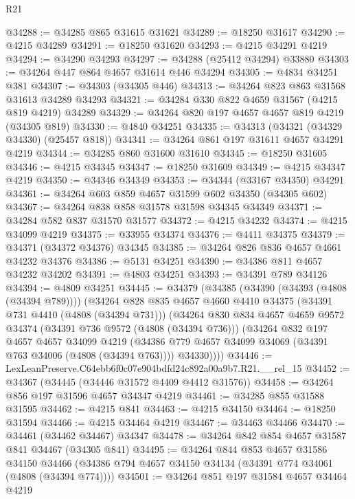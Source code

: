 \begin{lexlean}{R21}
\begin{coremodule}
@34288 := @34285 @865 @31615 @31621
@34289 := @18250 @31617
@34290 := @4215 @34289
@34291 := @18250 @31620
@34293 := @4215 @34291 @4219
@34294 := @34290 @34293
@34297 := @34288 (@25412 @34294) @33880
@34303 := @34264 @447 @864 @4657 @31614 @446 @34294
@34305 := @4834 @34251 @381
@34307 := @34303 (@34305 @446)
@34313 := @34264 @823 @863 @31568 @31613 @34289 @34293
@34321 := @34284 @330 @822 @4659 @31567 (@4215 @819 @4219) @34289
@34329 := @34264 @820 @197 @4657 @4657 @819 @4219 (@34305 @819)
@34330 := @4840 @34251
@34335 := @34313 (@34321 (@34329 @34330) (@25457 @818))
@34341 := @34264 @861 @197 @31611 @4657 @34291 @4219
@34344 := @34285 @860 @31600 @31610
@34345 := @18250 @31605
@34346 := @4215 @34345
@34347 := @18250 @31609
@34349 := @4215 @34347 @4219
@34350 := @34346 @34349
@34353 := @34344 (@33167 @34350) @34291
@34361 := @34264 @603 @859 @4657 @31599 @602 @34350 (@34305 @602)
@34367 := @34264 @838 @858 @31578 @31598 @34345 @34349
@34371 := @34284 @582 @837 @31570 @31577
@34372 := @4215 @34232
@34374 := @4215 @34099 @4219
@34375 := @33955 @34374
@34376 := @4411 @34375
@34379 := @34371 (@34372 @34376) @34345
@34385 := @34264 @826 @836 @4657 @4661 @34232 @34376
@34386 := @5131 @34251
@34390 := @34386 @811 @4657 @34232 @34202
@34391 := @4803 @34251
@34393 := @34391 @789 @34126
@34394 := @4809 @34251
@34445 := @34379
    (@34385
      (@34390 (@34393 (@4808 (@34394 @789))))
      (@34264
        @828
        @835
        @4657
        @4660
        @4410
        @34375
        (@34391 @731 @4410 (@4808 (@34394 @731)))
        (@34264
          @830
          @834
          @4657
          @4659
          @9572
          @34374
          (@34391 @736 @9572 (@4808 (@34394 @736)))
          (@34264
            @832
            @197
            @4657
            @4657
            @34099
            @4219
            (@34386 @779 @4657 @34099 @34069 (@34391 @763 @34006 (@4808 (@34394 @763))))
            @34330))))
@34446 := LexLeanPreserve.C64ebb6f0c07e904bdfd24c892a00a9b7.R21.__rel_15
@34452 := @34367 (@34445 (@34446 @31572 @4409 @4412 @31576))
@34458 := @34264 @856 @197 @31596 @4657 @34347 @4219
@34461 := @34285 @855 @31588 @31595
@34462 := @4215 @841
@34463 := @4215 @34150
@34464 := @18250 @31594
@34466 := @4215 @34464 @4219
@34467 := @34463 @34466
@34470 := @34461 (@34462 @34467) @34347
@34478 := @34264 @842 @854 @4657 @31587 @841 @34467 (@34305 @841)
@34495 := @34264
    @844
    @853
    @4657
    @31586
    @34150
    @34466
    (@34386 @794 @4657 @34150 @34134 (@34391 @774 @34061 (@4808 (@34394 @774))))
@34501 := @34264 @851 @197 @31584 @4657 @34464 @4219

\end{coremodule}
\end{lexlean}
